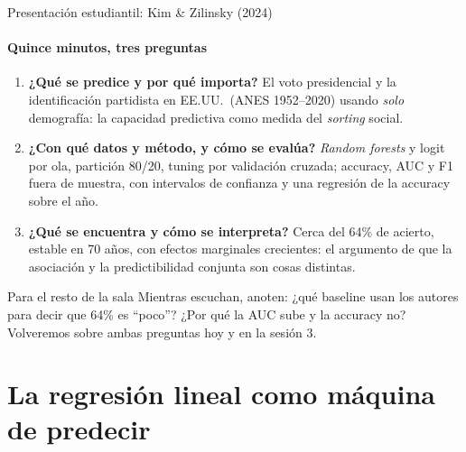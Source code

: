 \documentclass{beamer}
\newcommand{\1}{\mathbb{I}}
\begin{document}
\begin{frame}{Presentación estudiantil: Kim \& Zilinsky (2024)}
\framesubtitle{Quince minutos, tres preguntas}
\small
\begin{enumerate}\itemsep6pt
  \item \textbf{¿Qué se predice y por qué importa?} El voto presidencial y la identificación partidista en EE.UU.\ (ANES 1952--2020) usando \emph{solo} demografía: la capacidad predictiva como medida del \emph{sorting} social.
  \item \textbf{¿Con qué datos y método, y cómo se evalúa?} \emph{Random forests} y logit por ola, partición 80/20, tuning por validación cruzada; accuracy, AUC y F1 fuera de muestra, con intervalos de confianza y una regresión de la accuracy sobre el año.
  \item \textbf{¿Qué se encuentra y cómo se interpreta?} Cerca del 64\% de acierto, estable en 70 años, con efectos marginales crecientes: el argumento de que la asociación y la predictibilidad conjunta son cosas distintas.
\end{enumerate}
\pause
\vspace{0.2cm}
\begin{block}{Para el resto de la sala}
Mientras escuchan, anoten: ¿qué baseline usan los autores para decir que 64\% es ``poco''? ¿Por qué la AUC sube y la accuracy no? Volveremos sobre ambas preguntas hoy y en la sesión 3.
\end{block}
\end{frame}


\section{La regresión lineal como máquina de predecir}
\begin{frame}[noframenumbering]
\tableofcontents[currentsection]
\end{frame}
\end{document}
